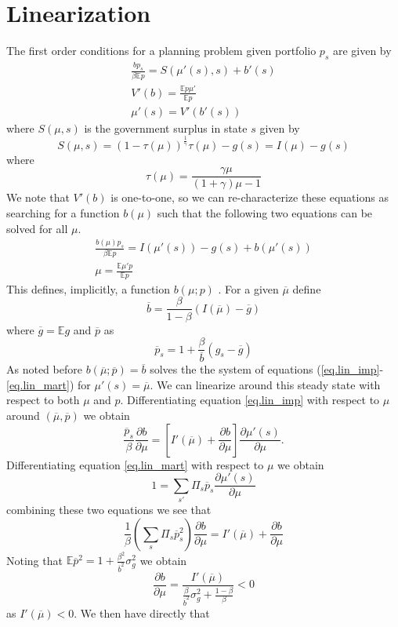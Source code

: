 \documentclass[12pt]{article}
\newcommand{\EE}{\mathbb E}
\newcommand{\pbar}{{\overline p}}
\newcommand{\bbar}{{\overline b}}
\newcommand{\mubar}{{\overline \mu}}
\begin{document}
\section{Linearization}
The first order conditions for a planning problem given portfolio $p_s$ are given by
\begin{align*}
	\frac{b p_s}{\beta \EE p}= S(\mu'(s),s) + b'(s)\\
	V'(b) = \frac{\EE p \mu'}{\EE p}\\
	\mu'(s) = V'(b'(s))
\end{align*} where $S(\mu,s)$ is the government surplus in state $s$ given by
\[
	S(\mu,s) = (1-\tau(\mu))^\frac1\gamma \tau(\mu)-g(s) = I(\mu) - g(s)
\]where
\[
	\tau(\mu) =\frac{\gamma\mu}{(1+\gamma)\mu-1}
\]We note that $V'(b)$ is one-to-one, so we can re-characterize these equations as searching for a function $b(\mu)$ such that the following two equations can be solved for all $\mu$.
\begin{align}\label{eq.lin_imp}
	\frac{b(\mu)p_s}{\beta \EE p} = I(\mu'(s)) - g(s) +b(\mu'(s))\\
	\mu = \frac{\EE\mu' p}{\EE p}\label{eq.lin_mart}
\end{align}  This defines, implicitly, a function $b(\mu; p)$ .  For a given $\overline \mu$ define 
\[
	\overline b = \frac{\beta}{1-\beta}\left( I(\overline\mu) - \overline g\right)
\]where $\overline g = \EE g$ and $\overline p$ as 
\[
	\overline p_s = 1+ \frac\beta{\overline b}(g_s - \overline g)
\]  As noted before $b(\overline\mu;\overline p) = \overline b$ solves the the system of equations (\ref{eq.lin_imp}-\ref{eq.lin_mart}) for $\mu'(s) = \overline \mu$.  We can linearize around this steady state with respect to both $\mu$ and $p$.  Differentiating equation \eqref{eq.lin_imp} with respect to $\mu$ around $(\overline \mu,\overline p)$ we obtain
\[
	\frac{\pbar_s}{\beta}\frac{\partial b}{\partial \mu} = \left[I'(\mubar)+\frac{\partial b}{\partial \mu}\right]\frac{\partial \mu'(s)}{\partial \mu}.
\]Differentiating equation \eqref{eq.lin_mart} with respect to $\mu$ we obtain
\[
	1 = \sum_{s'} \Pi_s \overline p_s \frac{\partial \mu'(s)}{\partial \mu}
\]combining these two equations we see that 
\[
	\frac1\beta\left(\sum_s\Pi_s\pbar_s^2\right)\frac{\partial b}{\partial \mu} = I'(\mubar) + \frac{\partial b}{\partial \mu}
\]Noting that $\EE\overline p^2 = 1 + \frac{\beta^2}{\bbar^2}\sigma^2_g$ we obtain
\begin{equation}
	\frac{\partial b}{\partial \mu} = \frac{I'(\mubar)}{\frac{\beta}{\bbar^2}\sigma_g^2 +\frac{1-\beta}{\beta}} < 0
\end{equation}as $I'(\mubar) < 0$.  We then have directly that 
\end{document}
